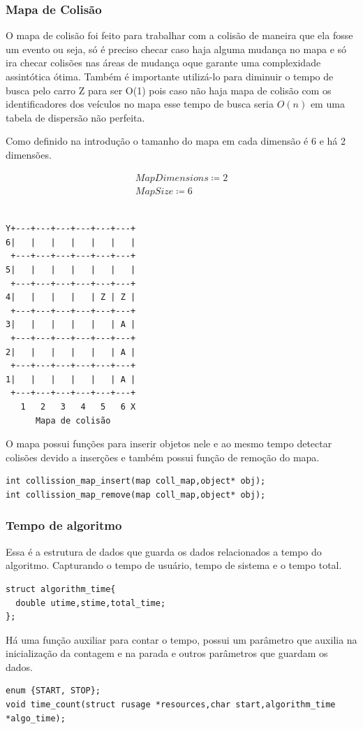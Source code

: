 \documentclass[11pt]{article}
\begin{document}
\subsubsection{Mapa de Colisão}
\label{sec:org730ec7b}
O mapa de colisão foi feito para trabalhar com a colisão de maneira que ela fosse um evento ou seja, só é preciso checar caso haja alguma mudança no mapa e só ira checar colisões nas áreas de mudança oque garante uma complexidade assintótica ótima.
Também é importante utilizá-lo para diminuir o tempo de busca pelo carro Z para ser O(1) pois caso não haja mapa de colisão com os identificadores dos veículos no mapa esse tempo de busca seria \(O(n)\) em uma tabela de dispersão não perfeita.

\bigskip
Como definido na introdução o tamanho do mapa em cada dimensão é 6 e há 2 dimensões.

\begin{equation}\label{eq:MapSize}
\begin{aligned}
MapDimensions \coloneqq 2\\
MapSize \coloneqq 6
\end{aligned}
\end{equation}


\begin{verbatim}

Y+---+---+---+---+---+---+
6|   |   |   |   |   |   |
 +---+---+---+---+---+---+
5|   |   |   |   |   |   |
 +---+---+---+---+---+---+
4|   |   |   |   | Z | Z |
 +---+---+---+---+---+---+
3|   |   |   |   |   | A |
 +---+---+---+---+---+---+
2|   |   |   |   |   | A |
 +---+---+---+---+---+---+
1|   |   |   |   |   | A |
 +---+---+---+---+---+---+
   1   2   3   4   5   6 X
      Mapa de colisão
\end{verbatim}

O mapa possui funções para inserir objetos nele e ao mesmo tempo detectar colisões devido a inserções e também possui função de remoção do mapa.

\begin{verbatim}
int collission_map_insert(map coll_map,object* obj);
int collission_map_remove(map coll_map,object* obj);
\end{verbatim}

\subsubsection{Tempo de algoritmo}
\label{sec:org7c392b8}
Essa é a estrutura de dados que guarda os dados relacionados a tempo do algoritmo. Capturando o tempo de usuário, tempo de sistema e o tempo total.
\begin{verbatim}
struct algorithm_time{
  double utime,stime,total_time;
};
\end{verbatim}
Há uma função auxiliar para contar o tempo, possui um parâmetro que auxilia na inicialização da contagem e na parada e outros parâmetros que guardam os dados.
\begin{verbatim}
enum {START, STOP};
void time_count(struct rusage *resources,char start,algorithm_time *algo_time);
\end{verbatim}
\end{document}
